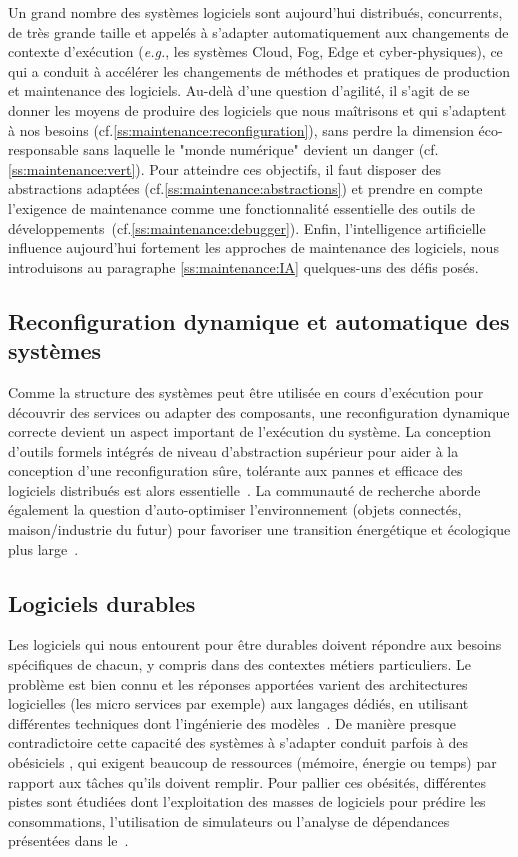 \documentclass[11pt]{article}
\newcommand{\eg}[0]{\emph{e.g.},\xspace}
\newcommand{\cf}[0]{cf.\xspace}
\newcommand{\defi}[1]{\cite[défi]{#1}}
\begin{document}
Un grand nombre des systèmes logiciels sont aujourd'hui distribués, concurrents, de très grande taille et appelés à s'adapter automatiquement aux changements de contexte d'exécution (\eg les systèmes Cloud, Fog, Edge et cyber-physiques), ce qui a conduit à accélérer les changements de méthodes et pratiques de production et maintenance des logiciels. Au-delà d'une question d'agilité, il s'agit de se donner les moyens de produire des logiciels que nous maîtrisons 
et qui s'adaptent à nos besoins (\cf\ref{ss:maintenance:reconfiguration}), sans perdre la dimension éco-responsable sans laquelle le "monde numérique" devient un danger (\cf\ref{ss:maintenance:vert}). 
Pour atteindre ces objectifs, il faut disposer des abstractions adaptées (\cf\ref{ss:maintenance:abstractions}) et prendre en compte l’exigence de maintenance comme une fonctionnalité essentielle des outils de développements~(\cf\ref{ss:maintenance:debugger}). Enfin, l'intelligence artificielle influence aujourd'hui fortement les approches de maintenance des logiciels, nous introduisons au paragraphe \ref{ss:maintenance:IA} quelques-uns des défis posés.


\subsection{Reconfiguration dynamique et automatique des systèmes \label{ss:maintenance:reconfiguration}}
Comme la structure des systèmes peut être utilisée en cours d'exécution pour découvrir des services ou adapter des composants, une reconfiguration dynamique correcte devient un aspect important de l'exécution du système. La conception d'outils formels intégrés de niveau d'abstraction supérieur pour aider à la conception d'une reconfiguration sûre, tolérante aux pannes et efficace des logiciels distribués est alors essentielle~\defi{reconfiguration}. 
La communauté de recherche aborde  également la question d’auto-optimiser 
l'environnement (objets connectés, maison/industrie du futur)
pour favoriser une transition énergétique et écologique plus large~\defi{vert}.


\subsection{Logiciels durables\label{ss:maintenance:vert}}
Les logiciels qui nous entourent pour être durables doivent répondre aux besoins spécifiques de chacun, y compris dans des contextes métiers particuliers. Le problème est bien connu et les réponses apportées varient des architectures logicielles (les micro services par exemple) aux langages dédiés, en utilisant différentes techniques dont l'ingénierie des modèles~\defi{coevolution}. 
De manière presque contradictoire 
cette capacité des systèmes à s’adapter conduit parfois à des
\og obésiciels \fg, qui exigent beaucoup de ressources (mémoire, énergie ou temps) par rapport aux tâches qu'ils doivent remplir. Pour pallier ces obésités, 
différentes pistes sont étudiées dont l'exploitation des masses de logiciels pour prédire les consommations, l'utilisation de simulateurs ou l'analyse de dépendances présentées dans le~\defi{vert}.
\end{document}
